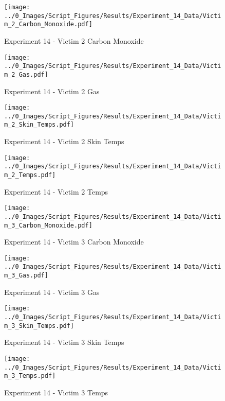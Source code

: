 	\clearpage

	\begin{figure}[H]
		\centering
		\texttt{[image: ../0\_Images/Script\_Figures/Results/Experiment\_14\_Data/Victim\_2\_Carbon\_Monoxide.pdf]}
		\caption[]{Experiment 14 - Victim 2 Carbon Monoxide}
	\end{figure}
 

	\begin{figure}[H]
		\centering
		\texttt{[image: ../0\_Images/Script\_Figures/Results/Experiment\_14\_Data/Victim\_2\_Gas.pdf]}
		\caption[]{Experiment 14 - Victim 2 Gas}
	\end{figure}
 
	\clearpage

	\begin{figure}[H]
		\centering
		\texttt{[image: ../0\_Images/Script\_Figures/Results/Experiment\_14\_Data/Victim\_2\_Skin\_Temps.pdf]}
		\caption[]{Experiment 14 - Victim 2 Skin Temps}
	\end{figure}
 

	\begin{figure}[H]
		\centering
		\texttt{[image: ../0\_Images/Script\_Figures/Results/Experiment\_14\_Data/Victim\_2\_Temps.pdf]}
		\caption[]{Experiment 14 - Victim 2 Temps}
	\end{figure}
 
	\clearpage

	\begin{figure}[H]
		\centering
		\texttt{[image: ../0\_Images/Script\_Figures/Results/Experiment\_14\_Data/Victim\_3\_Carbon\_Monoxide.pdf]}
		\caption[]{Experiment 14 - Victim 3 Carbon Monoxide}
	\end{figure}
 

	\begin{figure}[H]
		\centering
		\texttt{[image: ../0\_Images/Script\_Figures/Results/Experiment\_14\_Data/Victim\_3\_Gas.pdf]}
		\caption[]{Experiment 14 - Victim 3 Gas}
	\end{figure}
 
	\clearpage

	\begin{figure}[H]
		\centering
		\texttt{[image: ../0\_Images/Script\_Figures/Results/Experiment\_14\_Data/Victim\_3\_Skin\_Temps.pdf]}
		\caption[]{Experiment 14 - Victim 3 Skin Temps}
	\end{figure}
 

	\begin{figure}[H]
		\centering
		\texttt{[image: ../0\_Images/Script\_Figures/Results/Experiment\_14\_Data/Victim\_3\_Temps.pdf]}
		\caption[]{Experiment 14 - Victim 3 Temps}
	\end{figure}
 
